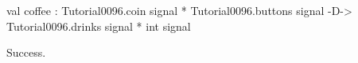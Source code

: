 \runverbatimtrue
{}
\begin{RunVerbatimMsg}
val coffee :
  Tutorial0096.coin signal * Tutorial0096.buttons signal -D-> Tutorial0096.drinks
                                                              signal *
                                                              int signal
\end{RunVerbatimMsg}
\begin{RunVerbatimErr}
Success.
\end{RunVerbatimErr}
